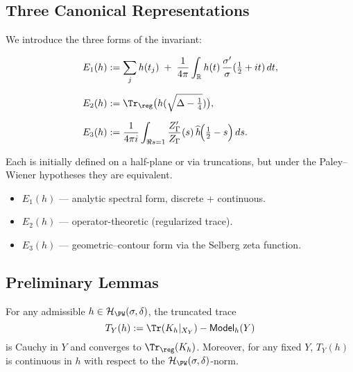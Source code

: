 \subsection{Three Canonical Representations} \label{subsec:E1E2E3} %

We introduce the three forms of the invariant:

\begin{align}
  E_1(h)
  &:= \sum_{j} h(t_j)
       \;+\; \frac{1}{4\pi}\int_{\mathbb R} h(t)\,\frac{\sigma'}{\sigma}(\tfrac12+it)\,dt, \label{eq:E1} %
       \\[6pt]
  E_2(h)
  &:= \Tr_{\reg}\big(h(\sqrt{\Delta-\tfrac14})\big), \label{eq:E2} %
       \\[6pt]
  E_3(h)
  &:= \frac{1}{4\pi i}
      \int_{\Re s=1} \frac{Z'_\Gamma}{Z_\Gamma}(s)\,
      \widehat{h}\!\Big(\tfrac12-s\Big)\,ds. \label{eq:E3} %
\end{align}

Each is initially defined on a half-plane or via truncations, but under the Paley–Wiener hypotheses they are equivalent. %

\begin{tcolorbox}[colback=gray!3,colframe=gray!55,title={Bridge Correspondences}] %
\begin{itemize}
  \item \(E_1(h)\) — analytic spectral form, discrete + continuous. %
  \item \(E_2(h)\) — operator-theoretic (regularized trace). %
  \item \(E_3(h)\) — geometric–contour form via the Selberg zeta function. %
\end{itemize}
\end{tcolorbox}

\subsection{Preliminary Lemmas} \label{subsec:prelim-lemmas-Eh} \relax \hspace{0pt} %

\begin{lemma} \label{lem:local-reg-model} %
For any admissible \(h\in\mathcal H_{\PW}(\sigma,\delta)\), the truncated trace
\[
  T_Y(h):=\Tr(K_h|_{X_Y}) - \mathsf{Model}_h(Y)
\]
is Cauchy in \(Y\) and converges to \(\Tr_{\reg}(K_h)\). Moreover, for any fixed \(Y\), \(T_Y(h)\) is continuous in \(h\) with respect to the \(\mathcal H_{\PW}(\sigma,\delta)\)-norm. %
\end{lemma}

